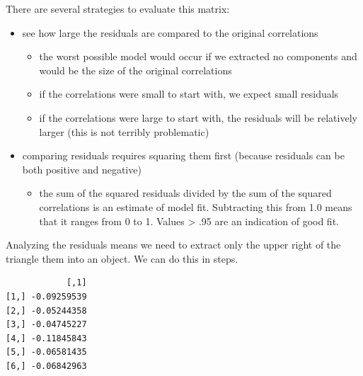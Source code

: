 \documentclass[
  english,
]{book}
\newenvironment{Shaded}{\begin{snugshade}}{\end{snugshade}}
\newcommand{\CommentTok}[1]{\textcolor[rgb]{0.56,0.35,0.01}{\textit{#1}}}
\newcommand{\KeywordTok}[1]{\textcolor[rgb]{0.13,0.29,0.53}{\textbf{#1}}}
\newcommand{\NormalTok}[1]{#1}
\newcommand{\OperatorTok}[1]{\textcolor[rgb]{0.81,0.36,0.00}{\textbf{#1}}}
\newcommand{\StringTok}[1]{\textcolor[rgb]{0.31,0.60,0.02}{#1}}
\providecommand{\tightlist}{%
  \setlength{\itemsep}{0pt}\setlength{\parskip}{0pt}}
\begin{document}
There are several strategies to evaluate this matrix:

\begin{itemize}
\tightlist
\item
  see how large the residuals are compared to the original correlations

  \begin{itemize}
  \tightlist
  \item
    the worst possible model would occur if we extracted no components and would be the size of the original correlations
  \item
    if the correlations were small to start with, we expect small residuals
  \item
    if the correlations were large to start with, the residuals will be relatively larger (this is not terribly problematic)
  \end{itemize}
\item
  comparing residuals requires squaring them first (because residuals can be both positive and negative)

  \begin{itemize}
  \tightlist
  \item
    the sum of the squared residuals divided by the sum of the squared correlations is an estimate of model fit. Subtracting this from 1.0 means that it ranges from 0 to 1. Values \textgreater{} .95 are an indication of good fit.
  \end{itemize}
\end{itemize}

Analyzing the residuals means we need to extract only the upper right of the triangle them into an object. We can do this in steps.

\begin{Shaded}
\end{Shaded}

\begin{verbatim}
            [,1]
[1,] -0.09259539
[2,] -0.05244358
[3,] -0.04745227
[4,] -0.11845843
[5,] -0.06581435
[6,] -0.06842963
\end{verbatim}
\end{document}
